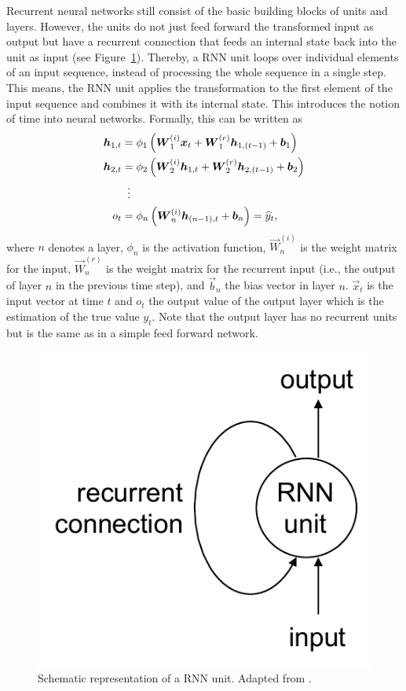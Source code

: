 Recurrent neural networks still consist of the basic building blocks of units and layers. However, the units do not just feed forward the transformed input as output but have a recurrent connection that feeds an internal state back into the unit as input (see Figure~\ref{Fig:RNNunit}). Thereby, a RNN unit loops over individual elements of an input sequence, instead of processing the whole sequence in a single step. This means, the RNN unit applies the transformation to the first element of the input sequence and combines it with its internal state. This introduces the notion of time into neural networks. Formally, this can be written as
%
\begin{equation} \label{Eq:RNN}
\begin{split}
    \vec{h}_{1,t}&=\phi_1\left(\vec{W}_1^{(i)}\vec{x}_t+\vec{W}^{(r)}_1\vec{h}_{1,(t-1)}+\vec{b}_1\right)\\
    \vec{h}_{2,t}&=\phi_2\left(\vec{W}_2^{(i)}\vec{h}_{1,t}+\vec{W}^{(r)}_2\vec{h}_{2,(t-1)}+\vec{b}_2\right)\\
    &\setbox0\hbox{=}\mathrel{\makebox[\wd0]{\hfil\vdots\hfil}}\\
    o_t&=\phi_n\left(\vec{W}_n^{(i)}\vec{h}_{(n-1),t}+\vec{b}_n\right)=\widehat{y}_t,
\end{split}
\end{equation}
%
where $n$ denotes a layer, $\phi_n$ is the activation function, $\vec{W}_n^{(i)}$ is the weight matrix for the input, $\vec{W}_n^{(r)}$ is the weight matrix for the recurrent input (i.e., the output of layer $n$ in the previous time step), and $\vec{b}_n$ the bias vector in layer $n$. $\vec{x}_t$ is the input vector at time $t$ and $o_t$ the output value of the output layer which is the estimation of the true value $y_t$. Note that the output layer has no recurrent units but is the same as in a simple feed forward network.
%
\begin{figure}[htbp]
    \centering
    \includegraphics[scale=0.5]{thesis/figures/RNNunit.pdf}
    \caption[Schematic representation of a RNN unit]{Schematic representation of a RNN unit. Adapted from \citet{chollet:2018}.}
    \label{Fig:RNNunit}
\end{figure}

